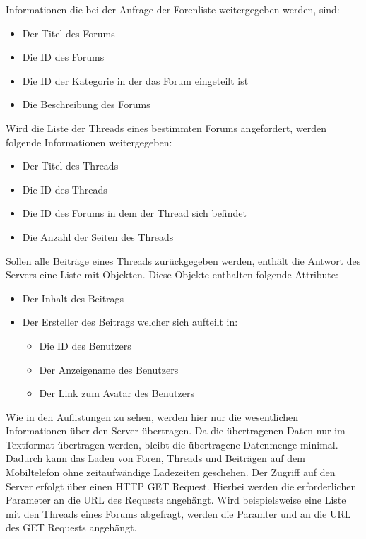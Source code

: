 Informationen die bei der Anfrage der Forenliste weitergegeben werden, sind:
\begin{itemize}
  \item Der Titel des Forums
  \item Die ID des Forums
  \item Die ID der Kategorie in der das Forum eingeteilt ist
  \item Die Beschreibung des Forums
\end{itemize}
Wird die Liste der Threads eines bestimmten Forums angefordert, werden folgende
Informationen weitergegeben:
\begin{itemize}
  \item Der Titel des Threads
  \item Die ID des Threads
  \item Die ID des Forums in dem der Thread sich befindet
  \item Die Anzahl der Seiten des Threads
\end{itemize}
Sollen alle Beiträge eines Threads zurückgegeben werden, enthält die Antwort des
Servers eine Liste mit  Objekten. Diese Objekte enthalten folgende
Attribute:
\begin{itemize} 
  \item Der Inhalt des Beitrags
  \item Der Ersteller des Beitrags welcher sich aufteilt in:
  \begin{itemize}
    \item Die ID des Benutzers
    \item Der Anzeigename des Benutzers
    \item Der Link zum Avatar des Benutzers
  \end{itemize}
\end{itemize}
Wie in den Auflistungen zu sehen, werden hier nur die wesentlichen Informationen
über den Server übertragen. Da die übertragenen Daten nur im Textformat
übertragen werden, bleibt die übertragene Datenmenge minimal. Dadurch kann das
Laden von Foren, Threads und Beiträgen auf dem Mobiltelefon ohne zeitaufwändige
Ladezeiten geschehen. Der Zugriff auf den Server erfolgt über einen HTTP GET
Request. Hierbei werden die erforderlichen Parameter an die URL des Requests
angehängt. Wird beispielsweise eine Liste mit den Threads eines Forums
abgefragt, werden die Paramter  und  an die URL
des GET Requests angehängt.
